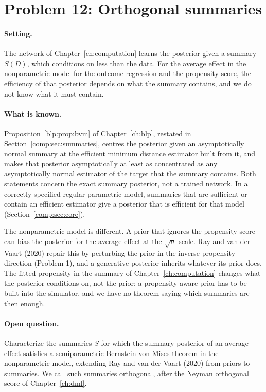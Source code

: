 \section{Problem 12: Orthogonal summaries}

\paragraph{Setting.} The network of Chapter~\ref{ch:computation} learns the posterior given a summary $S(D)$, which conditions on less than the data. For the average effect in the nonparametric model for the outcome regression and the propensity score, the efficiency of that posterior depends on what the summary contains, and we do not know what it must contain.

\paragraph{What is known.} Proposition~\ref{blp:prop:bvm} of Chapter~\ref{ch:blp}, restated in Section~\ref{comp:sec:summaries}, centres the posterior given an asymptotically normal summary at the efficient minimum distance estimator built from it, and makes that posterior asymptotically at least as concentrated as any asymptotically normal estimator of the target that the summary contains. Both statements concern the exact summary posterior, not a trained network. In a correctly specified regular parametric model, summaries that are sufficient or contain an efficient estimator give a posterior that is efficient for that model (Section~\ref{comp:sec:core}).

The nonparametric model is different. A prior that ignores the propensity score can bias the posterior for the average effect at the $\sqrt{n}$ scale. Ray and van der Vaart (2020) repair this by perturbing the prior in the inverse propensity direction (Problem 1), and a generative posterior inherits whatever its prior does. The fitted propensity in the summary of Chapter~\ref{ch:computation} changes what the posterior conditions on, not the prior: a propensity aware prior has to be built into the simulator, and we have no theorem saying which summaries are then enough.

\paragraph{Open question.} Characterize the summaries $S$ for which the summary posterior of an average effect satisfies a semiparametric Bernstein von Mises theorem in the nonparametric model, extending Ray and van der Vaart (2020) from priors to summaries. We call such summaries orthogonal, after the Neyman orthogonal score of Chapter~\ref{ch:dml}.


